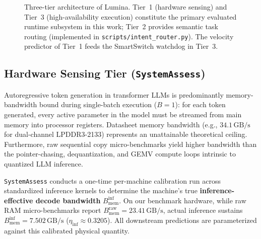 \documentclass[11pt,a4paper]{article}
\newcommand{\Binf}{B_{\mathrm{mem}}^{\mathrm{inf}}}
\newcommand{\Braw}{B_{\mathrm{mem}}^{\mathrm{raw}}}
\newcommand{\GBs}{\,\mathrm{GB/s}}
\newcommand{\code}[1]{\texttt{#1}}
\begin{document}
\begin{figure}[t]
{}
\caption{Three-tier architecture of Lumina. Tier~1 (hardware sensing) and Tier~3 (high-availability execution) constitute the primary evaluated runtime subsystem in this work; Tier~2 provides semantic task routing (implemented in \code{scripts/intent\_router.py}). The velocity predictor of Tier~1 feeds the SmartSwitch watchdog in Tier~3.}\label{fig:tiers}
\end{figure}

\subsection{Hardware Sensing Tier (\code{SystemAssess})}
Autoregressive token generation in transformer LLMs is predominantly memory-bandwidth bound during single-batch execution ($B=1$): for each token generated, every active parameter in the model must be streamed from main memory into processor registers. Datasheet memory bandwidth (e.g., $34.1\GBs$ for dual-channel LPDDR3-2133) represents an unattainable theoretical ceiling. Furthermore, raw sequential copy micro-benchmarks yield higher bandwidth than the pointer-chasing, dequantization, and GEMV compute loops intrinsic to quantized LLM inference.

\code{SystemAssess} conducts a one-time per-machine calibration run across standardized inference kernels to determine the machine's true \textbf{inference-effective decode bandwidth} $\Binf$. On our benchmark hardware, while raw RAM micro-benchmarks report $\Braw = 23.41\GBs$, actual inference sustains $\Binf = 7.502\GBs$ ($\eta_{\mathrm{inf}} \approx 0.3205$). All downstream predictions are parameterized against this calibrated physical quantity.
\end{document}
